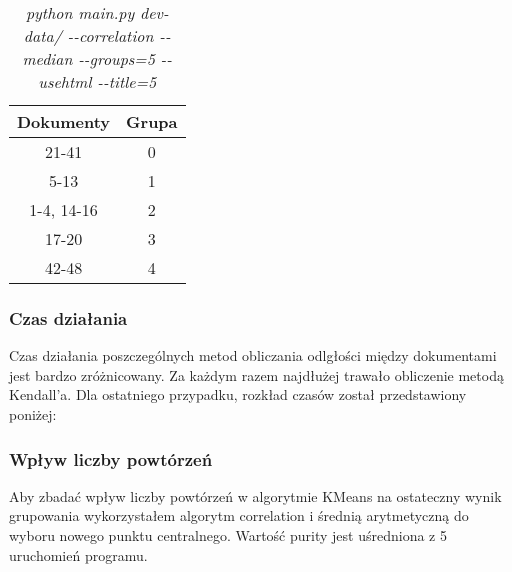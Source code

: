 \documentclass{article}
\begin{document}
\begin{table}[H]
\begin{center}
\begin{tabular}{ | c | c | }
\hline
Dokumenty & Grupa \\ \hline
21-41 & 0 \\ \hline
5-13 & 1 \\ \hline
1-4, 14-16 & 2 \\ \hline
17-20 & 3 \\ \hline
42-48 & 4 \\ \hline
\end{tabular}
\caption{\emph{python main.py dev-data/ -{}-correlation -{}-median -{}-groups=5 -{}-usehtml -{}-title=5}}
\end{center}
\end{table}

\subsubsection{Czas działania}

Czas działania poszczególnych metod obliczania odlgłości między dokumentami jest bardzo zróżnicowany. Za każdym razem najdłużej trawało obliczenie metodą Kendall'a. Dla ostatniego przypadku, rozkład czasów został przedstawiony poniżej:

\begin{center}
\end{center}

\subsubsection{Wpływ liczby powtórzeń}
Aby zbadać wpływ liczby powtórzeń w algorytmie KMeans na ostateczny wynik grupowania wykorzystałem algorytm correlation i średnią arytmetyczną do wyboru nowego punktu centralnego. Wartość purity jest uśredniona z 5 uruchomień programu. 
\end{document}
